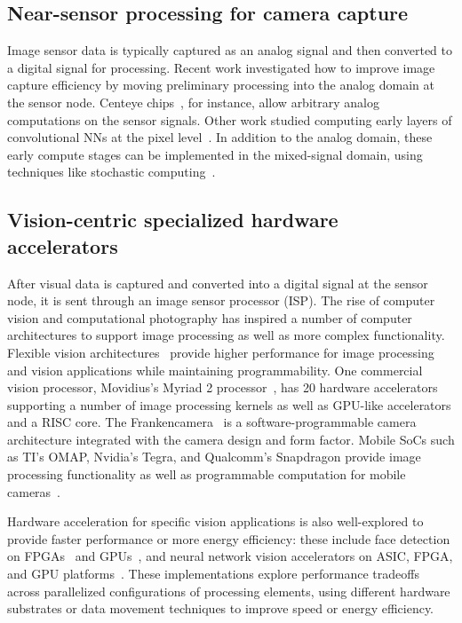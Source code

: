 \subsection{Near-sensor processing for camera capture}
\label{sec:related:camera}

Image sensor data is typically captured as an analog signal and then converted to a digital signal for processing.
Recent work investigated how to improve image capture efficiency by moving preliminary processing into the analog domain at the sensor node.
Centeye chips~\cite{Centeye}, for instance, allow arbitrary analog computations on the sensor signals.
Other work studied computing early layers of convolutional NNs at the pixel level~\cite{Chen_2016_ASPVision, redeye, conv-sens09}.
In addition to the analog domain, these early compute stages can be implemented in the mixed-signal domain, using techniques like stochastic computing~\cite{stoch-edge-sensor14, Alaghi13}.

\subsection{Vision-centric specialized hardware accelerators}
\label{sec:related:vision-hw}

After visual data is captured and converted into a digital signal at the sensor node, it is sent through an image sensor processor (ISP).
The rise of computer vision and computational photography has inspired a number of computer architectures to support image processing as well as more complex functionality.
Flexible vision architectures~\cite{convolution_engine, clemons_eva, clemons_pmem, hpca_visionsys, vasilyev_2016} provide higher performance for image processing and vision applications while maintaining programmability.
One commercial vision processor, Movidius's Myriad 2 processor~\cite{myriad15}, has 20 hardware accelerators supporting a number of image processing kernels as well as GPU-like accelerators and a RISC core.
The Frankencamera~\cite{adams2010frankencamera} is a software-programmable camera architecture integrated with the camera design and form factor.
Mobile SoCs such as TI's OMAP, Nvidia's Tegra, and Qualcomm's Snapdragon provide image processing functionality as well as programmable computation for mobile cameras~\cite{omap,tegra,snapdragon}.

Hardware acceleration for specific vision applications is also well-explored to provide faster performance or more energy efficiency: these include face detection on FPGAs~\cite{cvpr2007, cho_parallelized_2009} and GPUs~\cite{vj_gpu}, and neural network vision accelerators on ASIC, FPGA, and GPU platforms~\cite{farabet2010, neuflow,snnap,nn_fpga,nsp_iscas,bilat_isscc,myriad15,convolution_engine,shidiannao,minerva,eyeriss,buckler2018eva2}.
These implementations explore performance tradeoffs across parallelized configurations of processing elements, using different hardware substrates or data movement techniques to improve speed or energy efficiency.

